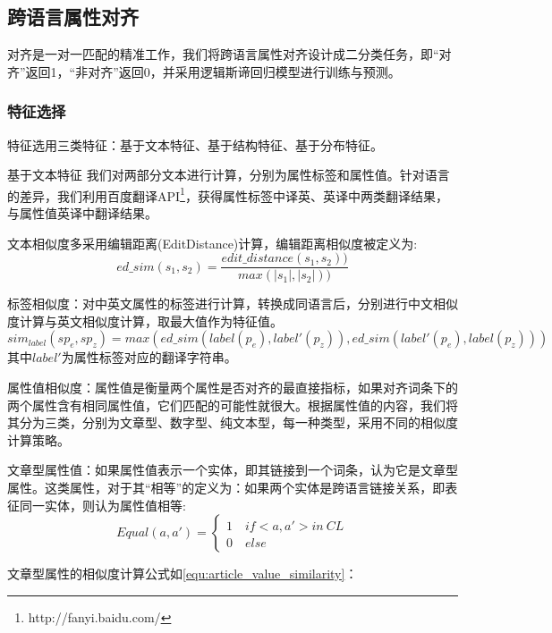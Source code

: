 \subsection{跨语言属性对齐}
\label{sec:cross-lingual-property-matching}
对齐是一对一匹配的精准工作，我们将跨语言属性对齐设计成二分类任务，即“对齐”返回1，“非对齐”返回0，并采用逻辑斯谛回归模型进行训练与预测。

\subsubsection{特征选择}
特征选用三类特征：基于文本特征、基于结构特征、基于分布特征。

{\heiti 基于文本特征} 我们对两部分文本进行计算，分别为属性标签和属性值。针对语言的差异，我们利用百度翻译API\footnote{http://fanyi.baidu.com/}，获得属性标签中译英、英译中两类翻译结果，与属性值英译中翻译结果。

文本相似度多采用编辑距离(EditDistance)计算，编辑距离相似度被定义为:
\begin{equation}
ed\_sim(s_1, s_2) = \frac{edit\_distance(s_1, s_2))}{max(\left| s_1 \right |,\left | s_2 \right |))}
\end{equation}

标签相似度：对中英文属性的标签进行计算，转换成同语言后，分别进行中文相似度计算与英文相似度计算，取最大值作为特征值。
\begin{equation}
\label{}
sim_{label}(sp_e, sp_z) = max(ed\_sim(label(p_e), label'(p_z)), ed\_sim(label'(p_e), label(p_z)))
\end{equation}
其中$label'$为属性标签对应的翻译字符串。

属性值相似度：属性值是衡量两个属性是否对齐的最直接指标，如果对齐词条下的两个属性含有相同属性值，它们匹配的可能性就很大。根据属性值的内容，我们将其分为三类，分别为文章型、数字型、纯文本型，每一种类型，采用不同的相似度计算策略。

文章型属性值：如果属性值表示一个实体，即其链接到一个词条，认为它是文章型属性。这类属性，对于其“相等”的定义为：如果两个实体是跨语言链接关系，即表征同一实体，则认为属性值相等:
\begin{equation}
Equal(a,a')=\left\{\begin{matrix}
1 \quad  if <a,a'> in \ CL\\
0 \quad  else
\end{matrix}\right.
\end{equation}

文章型属性的相似度计算公式如\ref{equ:article_value_similarity}：

